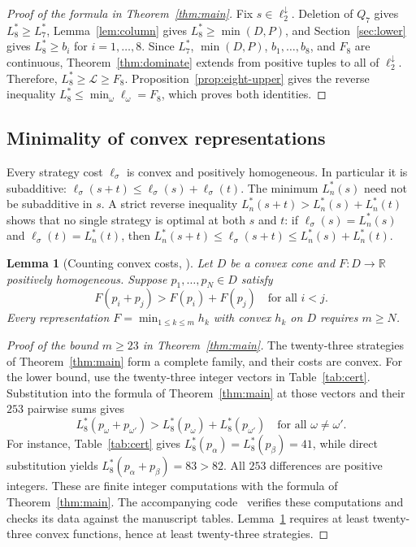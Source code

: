 \documentclass[12pt]{amsart}
\newtheorem{lemma}[theorem]{Lemma}
\theoremstyle{definition}
\theoremstyle{remark}
\numberwithin{equation}{section}
\numberwithin{figure}{section}
\numberwithin{table}{section}
\newcommand{\F}{F_8}
\begin{document}
\begin{proof}[Proof of the formula in Theorem~\ref{thm:main}]
Fix $s\in\ell_2^\downarrow$. Deletion of $Q_7$ gives $L_8^*\ge L_7^*$,
Lemma~\ref{lem:column} gives $L_8^*\ge\min(D,P)$, and
Section~\ref{sec:lower} gives $L_8^*\ge b_i$ for $i=1,\ldots,8$. Since
$L_7^*$, $\min(D,P)$, $b_1,\ldots,b_8$, and $\F$ are continuous,
Theorem~\ref{thm:dominate} extends from positive tuples to all of
$\ell_2^\downarrow$. Therefore, $L_8^*\ge\mathcal L\ge\F$.
Proposition~\ref{prop:eight-upper} gives the reverse inequality
$L_8^*\le\min_\omega\ell_\omega=\F$, which proves both identities.
\end{proof}

\subsection{Minimality of convex representations}\label{sec:minimality}
Every strategy cost $\ell_\sigma$ is convex and positively homogeneous. In
particular it is subadditive:
$\ell_\sigma(s+t)\le\ell_\sigma(s)+\ell_\sigma(t)$.
The minimum $L_n^*(s)$ need not be subadditive in $s$. A strict reverse
inequality $L_n^*(s+t)>L_n^*(s)+L_n^*(t)$ shows that no single strategy is
optimal at both $s$ and $t$: if $\ell_\sigma(s)=L_n^*(s)$ and
$\ell_\sigma(t)=L_n^*(t)$, then
$L_n^*(s+t)\le\ell_\sigma(s+t)\le L_n^*(s)+L_n^*(t)$.
\begin{lemma}[Counting convex costs, {\cite[Lemma~6.1]{BadgerSeven}}]\label{lem:count}
Let $D$ be a convex cone and $F:D\to\mathbb R$ positively homogeneous.
Suppose $p_1,\ldots,p_N\in D$ satisfy
\begin{equation}\label{eq:pairwise-super}
F(p_i+p_j)>F(p_i)+F(p_j)\quad\text{for all }i<j.
\end{equation}
Every representation $F=\min_{1\le k\le m}h_k$ with convex $h_k$ on $D$
requires $m\ge N$.
\end{lemma}
\begin{proof}[Proof of the bound $m\ge23$ in Theorem~\ref{thm:main}]
The twenty-three strategies of Theorem~\ref{thm:main} form a complete
family, and their costs are convex. For the lower bound, use the twenty-three integer vectors in
Table~\ref{tab:cert}. Substitution into the formula of
Theorem~\ref{thm:main} at those vectors and their $253$ pairwise sums gives
\begin{equation}\label{eq:eight-super}
L_8^*(p_\omega+p_{\omega'})>L_8^*(p_\omega)+L_8^*(p_{\omega'})\quad\text{for all }\omega\ne\omega'.
\end{equation}
For instance, Table~\ref{tab:cert} gives
$L_8^*(p_\alpha)=L_8^*(p_\beta)=41$, while direct substitution yields
$L_8^*(p_\alpha+p_\beta)=83>82$. All $253$ differences are positive
integers. These are finite integer computations with the formula of
Theorem~\ref{thm:main}. The accompanying code~\cite{BadgerCode} verifies
these computations and checks its data against the manuscript tables. Lemma~\ref{lem:count}
requires at least twenty-three convex functions, hence at least
twenty-three strategies.
\end{proof}
\end{document}
